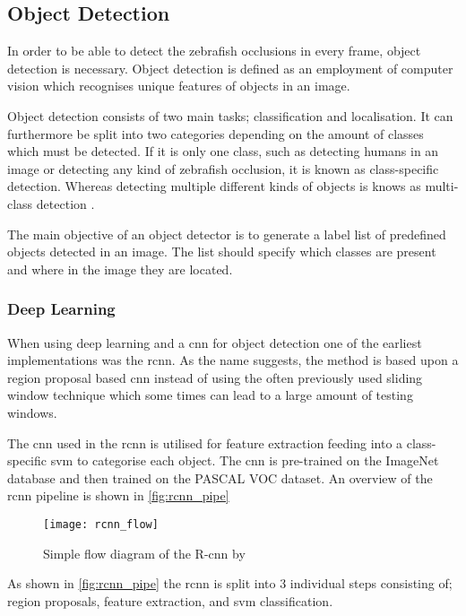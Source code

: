\subsection{Object Detection}\label{sec:obj_det}
In order to be able to detect the zebrafish occlusions in every frame, object detection is necessary. Object detection is defined as an employment of computer vision which recognises unique features of objects in an image.

Object detection consists of two main tasks; classification and localisation. It can furthermore be split into two categories depending on the amount of classes which must be detected. If it is only one class, such as detecting humans in an image or detecting any kind of zebrafish occlusion, it is known as class-specific detection. Whereas detecting multiple different kinds of objects is knows as multi-class detection  \citep{Zhang2013}.

The main objective of an object detector is to generate a label list of predefined objects detected in an image. The list should specify which classes are present and where in the image they are located.\\

\subsubsection{Deep Learning}
When using deep learning and a \gls{cnn} for object detection one of the earliest implementations was the \gls{rcnn}. As the name suggests, the method is based upon a region proposal based \gls{cnn} instead of using the often previously used sliding window technique which some times can lead to a large amount of testing windows.

The \gls{cnn} used in the \gls{rcnn} is utilised for feature extraction feeding into a class-specific \gls{svm} to categorise each object. The \gls{cnn} is pre-trained on the ImageNet database and then trained on the PASCAL VOC dataset. An overview of the \gls{rcnn} pipeline is shown in \autoref{fig:rcnn_pipe}

\begin{figure}[h]
	\centering
	\texttt{[image: rcnn\_flow]}
	\caption{Simple flow diagram of the R-\gls{cnn} by \cite{Girshick2014}}
	\label{fig:rcnn_pipe}
\end{figure}

As shown in \autoref{fig:rcnn_pipe} the \gls{rcnn} is split into 3 individual steps consisting of; region proposals, feature extraction, and \gls{svm} classification.\\


